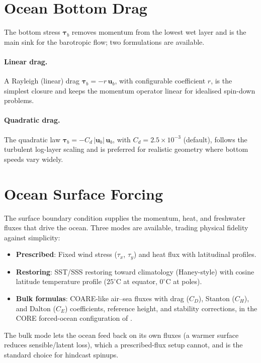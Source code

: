 \documentclass[11pt,twoside]{report}
\newcommand{\vect}[1]{\bm{#1}}
\begin{document}
\section{Ocean Bottom Drag}

The bottom stress $\vect{\tau}_b$ removes momentum from the lowest wet
layer and is the main sink for the barotropic flow; two formulations are
available.

\paragraph{Linear drag.}
A Rayleigh (linear) drag $\vect{\tau}_b = -r\,\vect{u}_b$, with configurable
coefficient $r$, is the simplest closure and keeps the momentum operator
linear for idealised spin-down problems.

\paragraph{Quadratic drag.}
The quadratic law $\vect{\tau}_b = -C_d\,|\vect{u}_b|\,\vect{u}_b$, with
$C_d = 2.5\times10^{-3}$ (default), follows the turbulent log-layer scaling
and is preferred for realistic geometry where bottom speeds vary widely.

\section{Ocean Surface Forcing}

The surface boundary condition supplies the momentum, heat, and freshwater
fluxes that drive the ocean.  Three modes are available, trading physical
fidelity against simplicity:
\begin{itemize}[nosep]
  \item \textbf{Prescribed}: Fixed wind stress ($\tau_x$, $\tau_y$) and heat flux with latitudinal profiles.
  \item \textbf{Restoring}: SST/SSS restoring toward climatology (Haney-style) with cosine latitude temperature profile ($25^\circ$C at equator, $0^\circ$C at poles).
  \item \textbf{Bulk formulas}: COARE-like air--sea fluxes with drag ($C_D$), Stanton ($C_H$), and Dalton ($C_E$) coefficients, reference height, and stability corrections, in the CORE forced-ocean configuration of \citet{LargeYeager2004}.
\end{itemize}
The bulk mode lets the ocean feed back on its own fluxes (a warmer surface
reduces sensible/latent loss), which a prescribed-flux setup cannot, and is
the standard choice for hindcast spinups.
\end{document}
